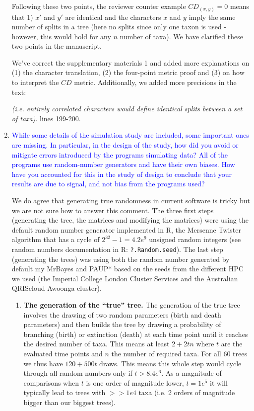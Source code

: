 \documentclass[12pt,letterpaper]{article}
\begin{document}
\begin{enumerate}
Following these two points, the reviewer counter example $CD_{(x,y)} = 0$ means that 1) $x'$ and $y'$ are identical and the characters $x$ and $y$ imply the same number of splits in a tree (here no splits since only one taxon is used - however, this would hold for any $n$ number of taxa).
We have clarified these two points in the manuscript.

We've correct the supplementary materials 1 and added more explanations on (1) the character translation, (2) the four-point metric proof and (3) on how to interpret the $CD$ metric.
Additionally, we added more precisions in the text:

\textit{(i.e. entirely correlated characters would define identical splits between a set of taxa)}. lines 199-200.

\item{\textcolor{blue}{While some details of the simulation study are included, some important ones are missing. In particular, in the design of the study, how did you avoid or mitigate errors introduced by the programs simulating data? All of the programs use random-number generators and have their own biases. How have you accounted for this in the study of design to conclude that your results are due to signal, and not bias from the programs used?}}

We do agree that generating true randomness in current software is tricky but we are not sure how to answer this comment.
The three first steps (generating the tree, the matrices and modifying the matrices) were using the default random number generator implemented in R, the Mersenne Twister algorithm that has a cycle of $2^{32}-1 = 4.2e^{9}$ unsigned random integers (see random numbers documentation in R: \texttt{?.Random.seed}).
The last step (generating the trees) was using both the random number generated by default my MrBayes and PAUP* based on the seeds from the different HPC we used (the Imperial College London Cluster Services and the Australian QRIScloud Awoonga cluster).

\begin{enumerate}
    \item \textbf{The generation of the ``true'' tree.}
    The generation of the true tree involves the drawing of two random parameters (birth and death parameters) and then builds the tree by drawing a probability of branching (birth) or extinction (death) at each time point until it reaches the desired number of taxa.
    This means at least $2 + 2tn$ where $t$ are the evaluated time points and $n$ the number of required taxa.
    For all 60 trees we thus have $120 + 500t$ draws. This means this whole step would cycle through all random numbers only if $t > 8.4e^{6}$. As a magnitude of comparisons when $t$ is one order of magnitude lower, $t = 1e^{5}$ it will typically lead to trees with $>> 1e{4}$ taxa (i.e. 2 orders of magnitude bigger than our biggest trees).
    

\end{enumerate}
\end{enumerate}
\end{document}
